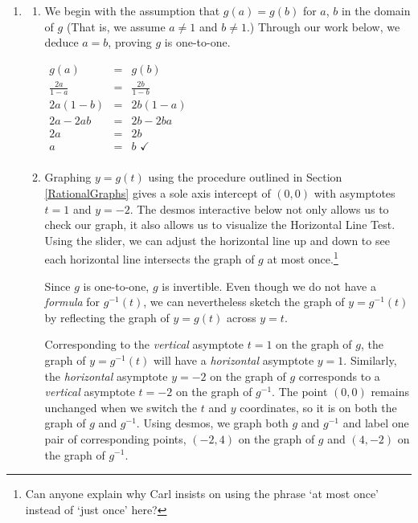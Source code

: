 \documentclass{ximera}
\begin{document}
\begin{example}
\begin{explanation}
\begin{enumerate}
\begin{enumerate}
\end{enumerate}

\item \begin{enumerate} \item We begin with the assumption that $g(a) = g(b)$ for $a$, $b$ in the domain of $g$ (That is, we assume $a \neq 1$ and $b \neq 1$.) Through our work below, we deduce $a=b$, proving $g$ is one-to-one.

\begin{center}
$\begin{array}{rcl}
g(a) & = & g(b)  \\  
\frac{2a}{1-a} & = & \frac{2b}{1-b}  \\  
2a(1-b) & = & 2b(1-a)  \\
2a - 2ab & = & 2b - 2ba  \\
2a & = & 2b  \\
a & = & b \, \, \checkmark \\ 
\end{array}$
\end{center}

\item  Graphing $y=g(t)$ using the procedure outlined in Section \ref{RationalGraphs} gives a sole axis intercept of $(0,0)$ with asymptotes $t=1$ and $y = -2$. The desmos interactive below not only allows us to check our graph, it also allows us to visualize the Horizontal Line Test.  Using the slider, we can adjust the horizontal line up and down to see each horizontal line intersects the graph of $g$ at most once.\footnote{Can anyone explain why Carl insists on using the phrase `at most once' instead of `just once' here?}

 \begin{center}
 \end{center}

Since $g$ is one-to-one, $g$ is invertible.  Even though we do not have a \textit{formula} for $g^{-1}(t)$, we can nevertheless sketch the graph of $y = g^{-1}(t)$ by reflecting the graph of $y=g(t)$ across  $y = t$.  

Corresponding to the \textit{vertical} asymptote $t=1$ on the graph of $g$, the graph of $y = g^{-1}(t)$ will have a \textit{horizontal} asymptote $y = 1$.  Similarly, the \textit{horizontal} asymptote $y=-2$ on the graph of $g$ corresponds to a \textit{vertical} asymptote $t = -2$ on the graph of $g^{-1}$.  The point $(0,0)$ remains unchanged when we switch the $t$ and $y$ coordinates, so it is on both the graph of $g$ and $g^{-1}$.   Using desmos, we graph both $g$ and $g^{-1}$ and label one pair of corresponding points, $(-2,4)$ on the graph of $g$ and $(4,-2)$ on the graph of $g^{-1}$.


\end{enumerate}
\end{enumerate}
\end{explanation}
\end{example}
\end{document}
